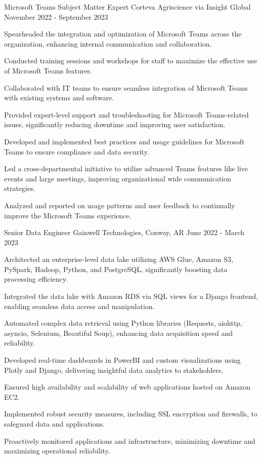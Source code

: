 \begin{cventries}
\cventry
{Microsoft Teams Subject Matter Expert} %
{Corteva Agriscience via Insight Global} %
{} %
{November 2022 - September 2023} %
{ %
\begin{cvitems}
\item {Spearheaded the integration and optimization of Microsoft Teams across the organization, enhancing internal communication and collaboration.}
\item {Conducted training sessions and workshops for staff to maximize the effective use of Microsoft Teams features.}
\item {Collaborated with IT teams to ensure seamless integration of Microsoft Teams with existing systems and software.}
\item {Provided expert-level support and troubleshooting for Microsoft Teams-related issues, significantly reducing downtime and improving user satisfaction.}
\item {Developed and implemented best practices and usage guidelines for Microsoft Teams to ensure compliance and data security.}
\item {Led a cross-departmental initiative to utilize advanced Teams features like live events and large meetings, improving organizational wide communication strategies.}
\item {Analyzed and reported on usage patterns and user feedback to continually improve the Microsoft Teams experience.}
\end{cvitems}
}




\cventry
{Senior Data Engineer} %
{Gainwell Technologies, Conway, AR} %
{} %
{June 2022 - March 2023} %
{ %
\begin{cvitems}
\item {Architected an enterprise-level data lake utilizing AWS Glue, Amazon S3, PySpark, Hadoop, Python, and PostgreSQL, significantly boosting data processing efficiency.}
\item {Integrated the data lake with Amazon RDS via SQL views for a Django frontend, enabling seamless data access and manipulation.}
\item {Automated complex data retrieval using Python libraries (Requests, aiohttp, asyncio, Selenium, Beautiful Soup), enhancing data acquisition speed and reliability.}
\item {Developed real-time dashboards in PowerBI and custom visualizations using Plotly and Django, delivering insightful data analytics to stakeholders.}
\item {Ensured high availability and scalability of web applications hosted on Amazon EC2.}
\item {Implemented robust security measures, including SSL encryption and firewalls, to safeguard data and applications.}
\item {Proactively monitored applications and infrastructure, minimizing downtime and maximizing operational reliability.}
\end{cvitems}
}


\end{cventries}
